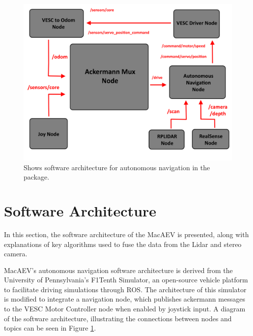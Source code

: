 \documentclass[conference]{IEEEtran}
\begin{document}
\begin{figure}[H]
    \centering
    \includegraphics[scale=0.25]{autonomous_architecture.png}
    \caption{Shows software architecture for autonomous navigation in the package.}
    \label{Figure 3}
\end{figure}


\section{Software Architecture}
In this section, the software architecture of the MacAEV is presented, along with explanations of key algorithms used to fuse the data from the Lidar and stereo camera. 

MacAEV's autonomous navigation software architecture is derived from the University of Pennsylvania's F1Tenth Simulator, an open-source vehicle platform to facilitate driving simulations through ROS. The architecture of this simulator is modified to integrate a navigation node, which publishes ackermann messages to the VESC Motor Controller node when enabled by joystick input. A diagram of the software architecture, illustrating the connections between nodes and topics can be seen in Figure \ref{Figure 3}.







\end{document}
